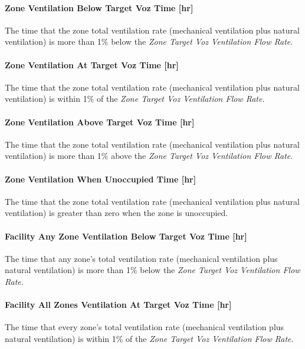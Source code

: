 \paragraph{Zone Ventilation Below Target Voz Time {[}hr{]}}\label{zone-ventilation-below-target-voz-time}
The time that the zone total ventilation rate (mechanical ventilation plus natural ventilation) is more than 1\% below the \emph{Zone Target Voz Ventilation Flow Rate}.

\paragraph{Zone Ventilation At Target Voz Time {[}hr{]}}\label{zone-ventilation-at-target-voz-time}
The time that the zone total ventilation rate (mechanical ventilation plus natural ventilation) is within 1\% of the \emph{Zone Target Voz Ventilation Flow Rate}.

\paragraph{Zone Ventilation Above Target Voz Time {[}hr{]}}\label{zone-ventilation-above-target-voz-time}
The time that the zone total ventilation rate (mechanical ventilation plus natural ventilation) is more than 1\% above the \emph{Zone Target Voz Ventilation Flow Rate}.

\paragraph{Zone Ventilation When Unoccupied Time {[}hr{]}}\label{zone-ventilation-when-unoccupied-time}
The time that the zone total ventilation rate (mechanical ventilation plus natural ventilation) is greater than zero when the zone is unoccupied.

\paragraph{Facility Any Zone Ventilation Below Target Voz Time {[}hr{]}}\label{facility-any-zone-ventilation-below-target-voz-time}
The time that any zone's total ventilation rate (mechanical ventilation plus natural ventilation) is more than 1\% below the \emph{Zone Target Voz Ventilation Flow Rate}.

\paragraph{Facility All Zones Ventilation At Target Voz Time {[}hr{]}}\label{facility-all-zones-ventilation-at-target-voz-time}
The time that every zone's total ventilation rate (mechanical ventilation plus natural ventilation) is within 1\% of the \emph{Zone Target Voz Ventilation Flow Rate}.

